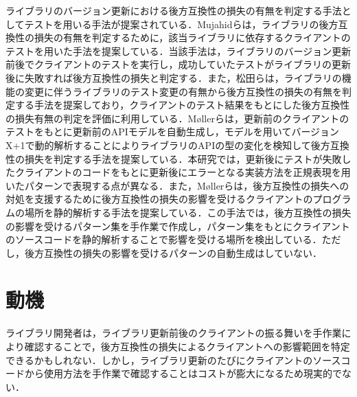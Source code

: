 \documentclass[11pt]{jreport}
\begin{document}
ライブラリのバージョン更新における後方互換性の損失の有無を判定する手法としてテストを用いる手法が提案されている\cite{mujahid}\cite{matsuda}．Mujahidらは，ライブラリの後方互換性の損失の有無を判定するために，該当ライブラリに依存するクライアントのテストを用いた手法を提案している\cite{mujahid}．当該手法は，ライブラリのバージョン更新前後でクライアントのテストを実行し，成功していたテストがライブラリの更新後に失敗すれば後方互換性の損失と判定する．また，松田らは，ライブラリの機能の変更に伴うライブラリのテスト変更の有無から後方互換性の損失の有無を判定する手法を提案しており，クライアントのテスト結果をもとにした後方互換性の損失有無の判定を評価に利用している\cite{matsuda}．M{\o}llerらは，更新前のクライアントのテストをもとに更新前のAPIモデルを自動生成し，モデルを用いてバージョンX+1で動的解析することによりライブラリのAPIの型の変化を検知して後方互換性の損失を判定する手法を提案している\cite{10.1145/3338906.3338940}．本研究では，更新後にテストが失敗したクライアントのコードをもとに更新後にエラーとなる実装方法を正規表現を用いたパターンで表現する点が異なる．また，M{\o}llerらは，後方互換性の損失への対処を支援するために後方互換性の損失の影響を受けるクライアントのプログラムの場所を静的解析する手法を提案している\cite{10.1145/3428255}．この手法では，後方互換性の損失の影響を受けるパターン集を手作業で作成し，パターン集をもとにクライアントのソースコードを静的解析することで影響を受ける場所を検出している．ただし，後方互換性の損失の影響を受けるパターンの自動生成はしていない．


\section{動機}
ライブラリ開発者は，ライブラリ更新前後のクライアントの振る舞いを手作業により確認することで，後方互換性の損失によるクライアントへの影響範囲を特定できるかもしれない．しかし，ライブラリ更新のたびにクライアントのソースコードから使用方法を手作業で確認することはコストが膨大になるため現実的でない．
\end{document}
